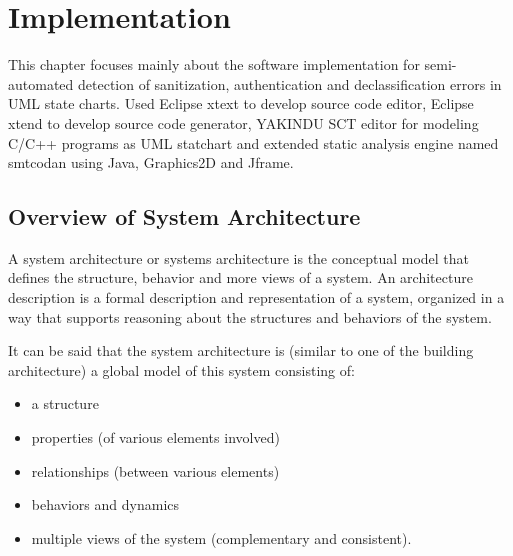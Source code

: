 \chapter{Implementation}
This chapter focuses mainly about the software implementation for semi-automated detection of sanitization, authentication and declassification errors in UML state charts. Used Eclipse xtext to develop source code editor, Eclipse xtend to develop source code generator, YAKINDU SCT editor for modeling C/C++ programs as UML statchart and extended static analysis engine named smtcodan using Java, Graphics2D and Jframe. 

\section{Overview of System Architecture}

A system architecture or systems architecture is the conceptual model that defines the structure, behavior and more views of a system. An architecture description is a formal description and representation of a system, organized in a way that supports reasoning about the structures and behaviors of the system.

It can be said that the system architecture is (similar to one of the building architecture)  a global model of this system consisting of:
\begin{itemize}
	\item   a structure
	\item	properties (of various elements involved)
	\item	relationships (between various elements)
	\item	behaviors and dynamics
	\item	multiple views of the system (complementary and consistent).
\end{itemize}

